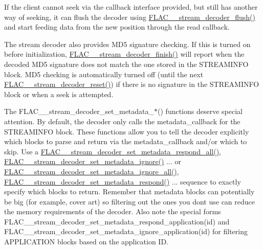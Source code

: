 If the client cannot seek via the callback interface provided, but still has another way of seeking, it can flush the decoder using \hyperlink{group__flac__stream__decoder_ga0109ce87f2c648b224b68c08b3c090cb}{F\+L\+A\+C\+\_\+\+\_\+stream\+\_\+decoder\+\_\+flush()} and start feeding data from the new position through the read callback.

The stream decoder also provides M\+D5 signature checking. If this is turned on before initialization, \hyperlink{group__flac__stream__decoder_gaa51bb38f762ee11b320a0839f165c5ce}{F\+L\+A\+C\+\_\+\+\_\+stream\+\_\+decoder\+\_\+finish()} will report when the decoded M\+D5 signature does not match the one stored in the S\+T\+R\+E\+A\+M\+I\+N\+FO block. M\+D5 checking is automatically turned off (until the next \hyperlink{group__flac__stream__decoder_ga2342cf4f3caf9ad20fca1373aaea0c27}{F\+L\+A\+C\+\_\+\+\_\+stream\+\_\+decoder\+\_\+reset()}) if there is no signature in the S\+T\+R\+E\+A\+M\+I\+N\+FO block or when a seek is attempted.

The F\+L\+A\+C\+\_\+\+\_\+stream\+\_\+decoder\+\_\+set\+\_\+metadata\+\_\+$\ast$() functions deserve special attention. By default, the decoder only calls the metadata\+\_\+callback for the S\+T\+R\+E\+A\+M\+I\+N\+FO block. These functions allow you to tell the decoder explicitly which blocks to parse and return via the metadata\+\_\+callback and/or which to skip. Use a \hyperlink{group__flac__stream__decoder_gaf3bec52172d727a4db8209b82db00c84}{F\+L\+A\+C\+\_\+\+\_\+stream\+\_\+decoder\+\_\+set\+\_\+metadata\+\_\+respond\+\_\+all()}, \hyperlink{group__flac__stream__decoder_ga0fb395d7c18c136d5a84869f6f2d736f}{F\+L\+A\+C\+\_\+\+\_\+stream\+\_\+decoder\+\_\+set\+\_\+metadata\+\_\+ignore()} ... or \hyperlink{group__flac__stream__decoder_ga6e515420f5b2a5422cd333b3d4c21064}{F\+L\+A\+C\+\_\+\+\_\+stream\+\_\+decoder\+\_\+set\+\_\+metadata\+\_\+ignore\+\_\+all()}, \hyperlink{group__flac__stream__decoder_ga1644555cae7c54215c39bb4971100728}{F\+L\+A\+C\+\_\+\+\_\+stream\+\_\+decoder\+\_\+set\+\_\+metadata\+\_\+respond()} ... sequence to exactly specify which blocks to return. Remember that metadata blocks can potentially be big (for example, cover art) so filtering out the ones you don\textquotesingle{}t use can reduce the memory requirements of the decoder. Also note the special forms F\+L\+A\+C\+\_\+\+\_\+stream\+\_\+decoder\+\_\+set\+\_\+metadata\+\_\+respond\+\_\+application(id) and F\+L\+A\+C\+\_\+\+\_\+stream\+\_\+decoder\+\_\+set\+\_\+metadata\+\_\+ignore\+\_\+application(id) for filtering A\+P\+P\+L\+I\+C\+A\+T\+I\+ON blocks based on the application ID.

